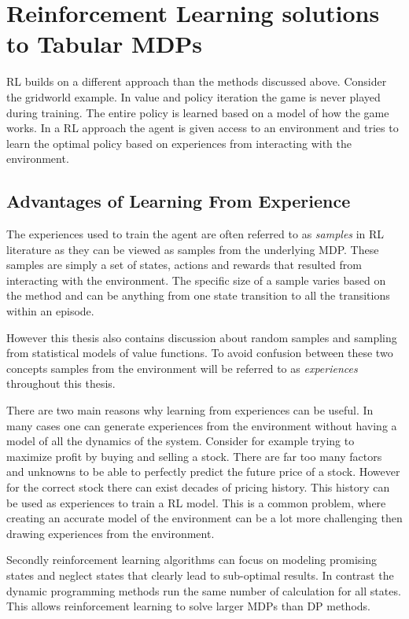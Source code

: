 \section{Reinforcement Learning solutions to Tabular MDPs}

RL builds on a different approach than the methods discussed above. Consider the gridworld example. In value and policy iteration the game is never played during training. The entire policy is learned based on a model of how the game works. In a RL approach the agent is given access to an environment and tries to learn the optimal policy based on experiences from interacting with the environment.

\subsection{Advantages of Learning From Experience}

The experiences used to train the agent are often referred to as \textit{samples} in RL literature as they can be viewed as samples from the underlying MDP. These samples are simply a set of states, actions and rewards that resulted from interacting with the environment. The specific size of a sample varies based on the method and can be anything from one state transition to all the transitions within an episode. 

However this thesis also contains discussion about random samples and sampling from statistical models of value functions. To avoid confusion between these two concepts samples from the environment will be referred to as \textit{experiences} throughout this thesis. 

There are two main reasons why learning from experiences can be useful. In many cases one can generate experiences from the environment without having a model of all the dynamics of the system. Consider for example trying to maximize profit by buying and selling a stock. There are far too many factors and unknowns to be able to perfectly predict the future price of a stock. However for the correct stock there can exist decades of pricing history. This history can be used as experiences to train a RL model. This is a common problem, where creating an accurate model of the environment can be a lot more challenging then drawing experiences from the environment.

Secondly reinforcement learning algorithms can focus on modeling promising states and neglect states that clearly lead to sub-optimal results. In contrast the dynamic programming methods run the same number of calculation for all states. This allows reinforcement learning to solve larger MDPs than DP methods. \citep[p.~115]{sutton_barto_2018}

